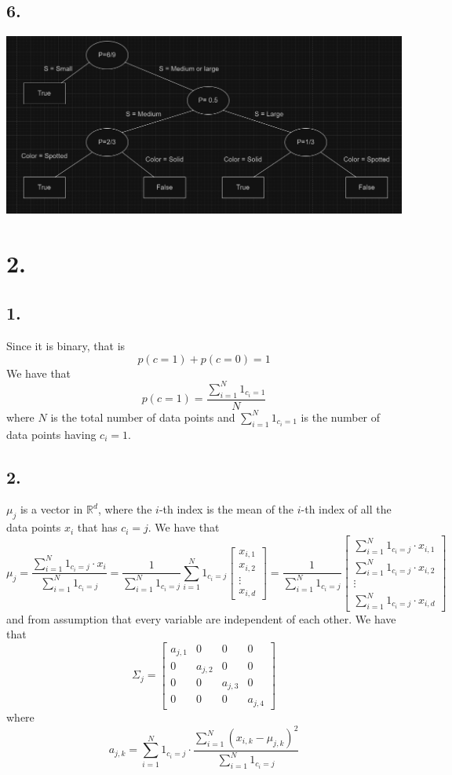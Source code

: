 \documentclass[11pt]{article}
\theoremstyle{mystyle}
\theoremstyle{definition}
\begin{document}
\subsection*{6.}
\includegraphics[scale=0.5]{BDT.png}
\section*{2.}
\subsection*{1.}
Since it is binary, that is 
\[
  p(c=1) + p(c=0) = 1
\]
We have that 
\[
  p(c=1) = \frac{\sum_{i=1}^N 1_{c_i = 1}}{N}
\]
where $N$ is the total number of data points and $\sum_{i=1}^N 1_{c_i = 1}$ is the number of data points having $c_i = 1$.  
\subsection*{2.}
$\mu_j$ is a vector in $\mathbb{R}^d$, where the $i$-th index is the mean of the $i$-th index of all the data points $x_i$ that has $c_i = j$. We have that  
\[
  \mu_j = 
  \frac{\sum_{i=1}^N 1_{c_i = j} \cdot x_i }{\sum_{i=1}^N 1_{c_i = j}}
  =
  \frac{1}{\sum_{i=1}^N 1_{c_i = j}}
  \sum_{i=1}^N
  1_{c_i = j}
  \begin{bmatrix}
    x_{i,1} \\
    x_{i,2} \\
    \vdots \\
    x_{i,d}
  \end{bmatrix} 
  = 
  \frac{1}{\sum_{i=1}^N 1_{c_i = j}}
  \begin{bmatrix}
  \sum_{i=1}^N
    1_{c_i = j} \cdot 
    x_{i,1} \\
  \sum_{i=1}^N 
    1_{c_i = j} \cdot 
    x_{i,2} \\
    \vdots \\
  \sum_{i=1}^N 
    1_{c_i = j} \cdot 
    x_{i,d}
  \end{bmatrix} 
\]
and from assumption that every variable are independent of each other. We have that 
\[
  \Sigma_j = 
  \begin{bmatrix}
    a_{j,1} & 0 & 0 & 0 \\ 
    0 & a_{j,2} & 0 & 0 \\
    0 & 0 & a_{j,3} & 0 \\
    0 & 0 & 0 & a_{j,4}
  \end{bmatrix}
\]
where 
\[
  a_{j,k} = \sum_{i=1}^N 1_{c_i = j} \cdot \frac{\sum_{i=1}^N (x_{i,k} - \mu_{j,k} )^2}{\sum_{i=1}^N 1_{c_i = j}}
\]
\end{document}
